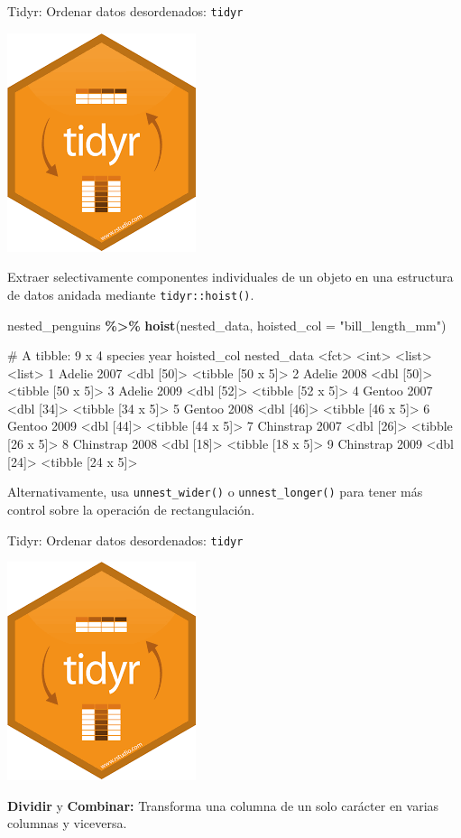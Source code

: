 \documentclass[
  ignorenonframetext,
  aspectratio=169]{beamer}
\newenvironment{Shaded}{\begin{snugshade}}{\end{snugshade}}
\newcommand{\AttributeTok}[1]{\textcolor[rgb]{0.13,0.29,0.53}{#1}}
\newcommand{\FunctionTok}[1]{\textcolor[rgb]{0.13,0.29,0.53}{\textbf{#1}}}
\newcommand{\NormalTok}[1]{#1}
\newcommand{\SpecialCharTok}[1]{\textcolor[rgb]{0.81,0.36,0.00}{\textbf{#1}}}
\newcommand{\StringTok}[1]{\textcolor[rgb]{0.31,0.60,0.02}{#1}}
\let\oldverbatim\verbatim
\let\endoldverbatim\endverbatim
\renewenvironment{verbatim}{\tiny\oldverbatim}{\endoldverbatim}
\begin{document}
\begin{frame}[fragile]{Tidyr: Ordenar datos desordenados:
\texttt{tidyr}}
\label{tidyr-ordenar-datos-desordenados-tidyr-8}
\begin{flushright}\includegraphics[width=0.05\linewidth]{Imgs/logo_tidyr} \end{flushright}

Extraer selectivamente componentes individuales de un objeto en una
estructura de datos anidada mediante \texttt{tidyr::hoist()}.

\begin{Shaded}
\begin{Highlighting}[]
\NormalTok{nested\_penguins }\SpecialCharTok{\%\textgreater{}\%} \FunctionTok{hoist}\NormalTok{(nested\_data, }\AttributeTok{hoisted\_col =} \StringTok{"bill\_length\_mm"}\NormalTok{)}
\end{Highlighting}
\end{Shaded}

\begin{verbatim}
# A tibble: 9 x 4
  species    year hoisted_col nested_data      
  <fct>     <int> <list>      <list>           
1 Adelie     2007 <dbl [50]>  <tibble [50 x 5]>
2 Adelie     2008 <dbl [50]>  <tibble [50 x 5]>
3 Adelie     2009 <dbl [52]>  <tibble [52 x 5]>
4 Gentoo     2007 <dbl [34]>  <tibble [34 x 5]>
5 Gentoo     2008 <dbl [46]>  <tibble [46 x 5]>
6 Gentoo     2009 <dbl [44]>  <tibble [44 x 5]>
7 Chinstrap  2007 <dbl [26]>  <tibble [26 x 5]>
8 Chinstrap  2008 <dbl [18]>  <tibble [18 x 5]>
9 Chinstrap  2009 <dbl [24]>  <tibble [24 x 5]>
\end{verbatim}

Alternativamente, usa \texttt{unnest\_wider()} o
\texttt{unnest\_longer()} para tener más control sobre la operación de
rectangulación.
\end{frame}

\begin{frame}{Tidyr: Ordenar datos desordenados: \texttt{tidyr}}
\label{tidyr-ordenar-datos-desordenados-tidyr-9}
\begin{flushright}\includegraphics[width=0.05\linewidth]{Imgs/logo_tidyr} \end{flushright}

\textbf{Dividir} y \textbf{Combinar:} Transforma una columna de un solo
carácter en varias columnas y viceversa.
\end{frame}
\end{document}
